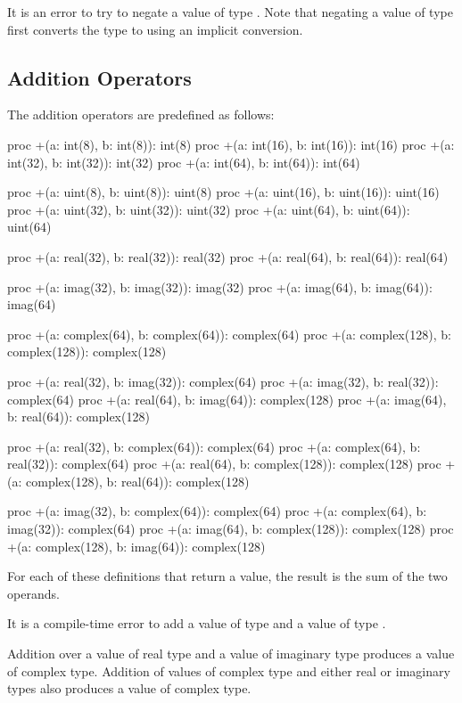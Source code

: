 It is an error to try to negate a value of type .  Note
that negating a value of type  first converts the type
to  using an implicit conversion.

\pagebreak
\subsection{Addition Operators}
\label{Addition_Operators}

The addition operators are predefined as follows:
\begin{chapel}
proc +(a: int(8), b: int(8)): int(8)
proc +(a: int(16), b: int(16)): int(16)
proc +(a: int(32), b: int(32)): int(32)
proc +(a: int(64), b: int(64)): int(64)

proc +(a: uint(8), b: uint(8)): uint(8)
proc +(a: uint(16), b: uint(16)): uint(16)
proc +(a: uint(32), b: uint(32)): uint(32)
proc +(a: uint(64), b: uint(64)): uint(64)

proc +(a: real(32), b: real(32)): real(32)
proc +(a: real(64), b: real(64)): real(64)

proc +(a: imag(32), b: imag(32)): imag(32)
proc +(a: imag(64), b: imag(64)): imag(64)

proc +(a: complex(64), b: complex(64)): complex(64)
proc +(a: complex(128), b: complex(128)): complex(128)

proc +(a: real(32), b: imag(32)): complex(64)
proc +(a: imag(32), b: real(32)): complex(64)
proc +(a: real(64), b: imag(64)): complex(128)
proc +(a: imag(64), b: real(64)): complex(128)

proc +(a: real(32), b: complex(64)): complex(64)
proc +(a: complex(64), b: real(32)): complex(64)
proc +(a: real(64), b: complex(128)): complex(128)
proc +(a: complex(128), b: real(64)): complex(128)

proc +(a: imag(32), b: complex(64)): complex(64)
proc +(a: complex(64), b: imag(32)): complex(64)
proc +(a: imag(64), b: complex(128)): complex(128)
proc +(a: complex(128), b: imag(64)): complex(128)
\end{chapel}
For each of these definitions that return a value, the result is the
sum of the two operands.

It is a compile-time error to add a value of type  and
a value of type .

Addition over a value of real type and a value of imaginary type
produces a value of complex type.  Addition of values of complex type
and either real or imaginary types also produces a value of complex
type.

